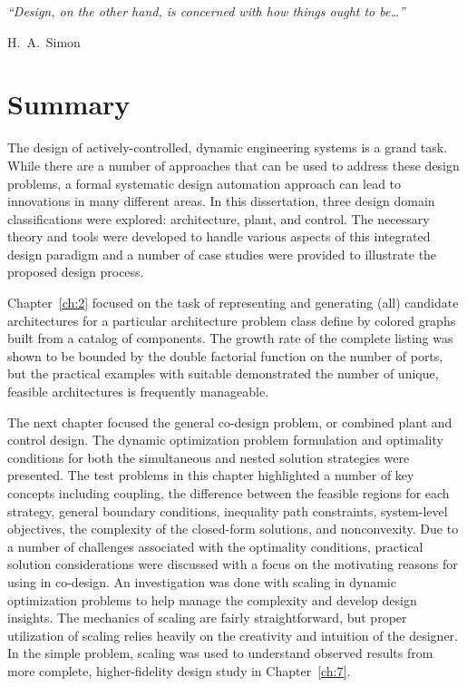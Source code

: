 
\epigraph{\textit{``Design, on the other hand, is concerned with how things ought to be\dots''}}{\textmd{H.~A.~Simon} \cite[p.~114]{Simon1996a}}

\section{Summary}

The design of actively-controlled, dynamic engineering systems is a grand task.
While there are a number of approaches that can be used to address these design problems, a formal systematic design automation approach can lead to innovations in many different areas. 
In this dissertation, three design domain classifications were explored: architecture, plant, and control. 
The necessary theory and tools were developed to handle various aspects of this integrated design paradigm and a number of case studies were provided to illustrate the proposed design process.

Chapter~\ref{ch:2} focused on the task of representing and generating (all) candidate architectures for a particular architecture problem class define by colored graphs built from a catalog of components.
The growth rate of the complete listing was shown to be bounded by the double factorial function on the number of ports, but the practical examples with suitable  demonstrated the number of unique, feasible architectures is frequently manageable.

The next chapter focused the general co-design problem, or combined plant and control design.
The dynamic optimization problem formulation and optimality conditions for both the simultaneous and nested solution strategies were presented.
The test problems in this chapter highlighted a number of key concepts including coupling, the difference between the feasible regions for each strategy, general boundary conditions, inequality path constraints, system-level objectives, the complexity of the closed-form solutions, and nonconvexity.
Due to a number of challenges associated with the optimality conditions, practical solution considerations were discussed with a focus on the motivating reasons for using  in co-design.
An investigation was done with scaling in dynamic optimization problems to help manage the complexity and develop design insights.
The mechanics of scaling are fairly straightforward, but proper utilization of scaling relies heavily on the creativity and intuition of the designer.
In the simple  problem, scaling was used to understand observed results from more complete, higher-fidelity design study in Chapter~\ref{ch:7}.

